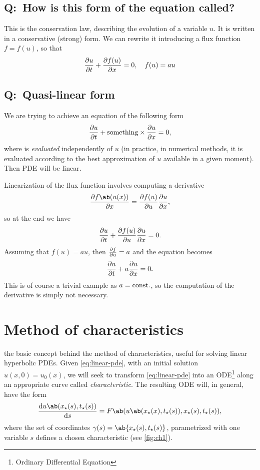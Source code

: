 \documentclass[justified, nobib, a4page]{tufte-handout}
\newcommand{\Q}[1]{\subsection{Q:~{#1}}}
\begin{document}
\Q{How is this form of the equation called?}
This is the conservation law, describing the evolution of a variable \(u\). It is
written in a conservative (strong) form. We can rewrite it introducing a flux 
function \(f=f(u)\), so that 
\[
  \pdv{u}{t} + \pdv{f(u)}{x} = 0, \quad f(u) = au
\]

\Q{Quasi-linear form}
We are trying to achieve an equation of the following form
\begin{equation}
  \pdv{u}{t} + \mathrm{something}\times\pdv{u}{x} = 0,
  \label{eq:quasi-lin}
\end{equation}
where  is \emph{evaluated} independently of \(u\) (in practice,
in numerical methods, it is evaluated according to the best approximation of
\(u\) available in a given moment). Then PDE will be linear. 

Linearization of the flux function involves computing a derivative
\[
  \pdv{f\ab(u(x))}{x} = \pdv{f(u)}{u}\pdv{u}{x},
\]
so at the end we have
\[
  \pdv{u}{t} + \pdv{f(u)}{u}\pdv{u}{x} = 0.
\]
Assuming that \(f(u) = au\), then \(\pdv{f}{u} = a\) and the equation becomes
\[
  \pdv{u}{t} + a\pdv{u}{x} = 0.
\]
This is of course a trivial example as \(a=\mathrm{const.}\), so the computation of the 
derivative is simply not necessary.



\section{Method of characteristics}

 the basic concept behind the method of
characteristics, useful for solving linear hyperbolic PDEs. Given
\cref{eq:linear-pde}, with an initial solution \(u(x, 0) = u_0(x)\), we will
seek to transform \cref{eq:linear-pde} into an ODE\footnote{Ordinary
Differential Equation} along an appropriate curve called \emph{characteristic}.
The resulting ODE will, in general, have the form 
\begin{equation}
  \odv{u\ab(x_\star(s), t_\star(s))}{s} 
    = F\ab(u\ab(x_\star(x), t_\star(s)), x_\star(s), t_\star(s)),
  \label{eq:char-gen}
\end{equation}
where the set of coordinates \(\gamma(s) = \ab\{x_\star(s), t_\star(s)\}\),
parametrized with one variable \(s\) defines a chosen characteristic (see
\cref{fig:ch1}).
\end{document}
